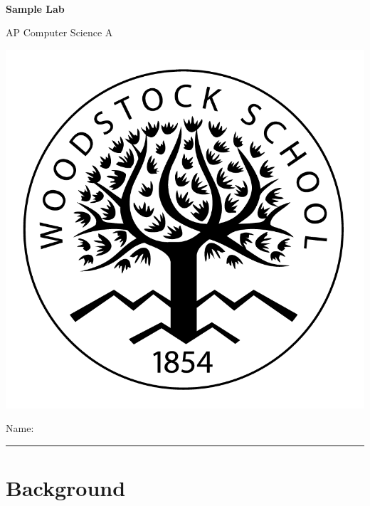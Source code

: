 

\def\LabCourse{AP Computer Science A}
\def\LabNumber{00}
\def\LabTitle{Sample Lab}


	\begin{coverpages}
		\ \\[2cm]
		\begin{center}
			\huge
			\textbf{\LabTitle}

			\Large
			\LabCourse
		\end{center}

		\vspace{1.5cm}

		\begin{center}
			\includegraphics[scale=0.45]{graphics/logo_black}

			\vspace{2.5cm}

			\Large
			Name: \rule{11.5cm}{0.1pt}
		\end{center}
	\end{coverpages}

	\blankpage

	\thispagestyle{empty}
	\tableofcontents

	\pagebreak

	\section{Background}
